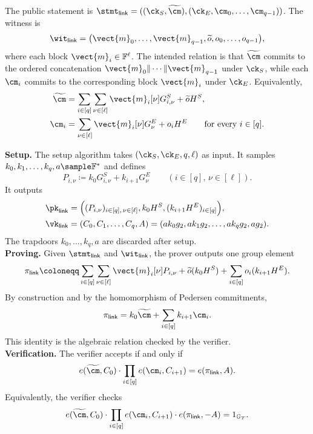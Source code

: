 The public statement is
\(\stmt_{\mathsf{link}}=((\ck_S,\widetilde{\cm}),
(\ck_E,\cm_0,\ldots,\cm_{q-1}))\).  The witness is
\[
  \wit_{\mathsf{link}}
  =
  \big(
    \vect{m}_0,\ldots,\vect{m}_{q-1},
    \widetilde{o},
    o_0,\ldots,o_{q-1}
  \big),
\]
where each block \(\vect{m}_i\in\mathbb{F}^{\ell}\).  The intended relation is
that \(\widetilde{\cm}\) commits to the ordered concatenation
\(\vect{m}_0\|\cdots\|\vect{m}_{q-1}\) under \(\ck_S\), while each
\(\cm_i\) commits to the corresponding block \(\vect{m}_i\) under \(\ck_E\).
Equivalently,
\[
\begin{aligned}
  \widetilde{\cm}
  &=
  \sum_{i\in[q]}\sum_{\nu\in[\ell]}
  \vect{m}_i[\nu]G^S_{i,\nu}
  +
  \widetilde{o}H^S, \\
  \cm_i
  &=
  \sum_{\nu\in[\ell]}
  \vect{m}_i[\nu]G^E_{\nu}
  +
  o_iH^E
  \qquad \text{for every } i\in[q].
\end{aligned}
\]

\noindent\textbf{Setup.}
The setup algorithm takes \((\ck_S,\ck_E,q,\ell)\) as input.  It samples
\(k_0,k_1,\ldots,k_q,a\sample\mathbb{F}^{\ast}\) and defines
\[
  P_{i,\nu} \coloneqq k_0G^S_{i,\nu}+k_{i+1}G^E_{\nu}
  \qquad
  (i\in[q],\,\nu\in[\ell]).
\]
It outputs
\[
\begin{aligned}
  \pk_{\mathsf{link}}
  &=
  \Big(
    (P_{i,\nu})_{i\in[q],\,\nu\in[\ell]},
    k_0H^S,
    (k_{i+1}H^E)_{i\in[q]}
  \Big), \\
  \vk_{\mathsf{link}}
  &=
  (C_0,C_1,\ldots,C_q,A)
  =
  (ak_0g_2,ak_1g_2,\ldots,ak_qg_2,ag_2).
\end{aligned}
\]
The trapdoors \(k_0,\ldots,k_q,a\) are discarded after setup. \\

\noindent\textbf{Proving.}
Given \(\stmt_{\mathsf{link}}\) and \(\wit_{\mathsf{link}}\), the prover
outputs one group element
\[
\begin{aligned}
  \pi_{\mathsf{link}}
  \coloneqq
  \sum_{i\in[q]}\sum_{\nu\in[\ell]}
  \vect{m}_i[\nu]P_{i,\nu}
  +
  \widetilde{o}(k_0H^S)
  +
  \sum_{i\in[q]} o_i(k_{i+1}H^E).
\end{aligned}
\]
By construction and by the homomorphism of Pedersen commitments,
\[
  \pi_{\mathsf{link}}
  =
  k_0\widetilde{\cm}
  +
  \sum_{i\in[q]} k_{i+1}\cm_i .
\]
This identity is the algebraic relation checked by the verifier. \\

\noindent\textbf{Verification.}
The verifier accepts if and only if
\[
  e(\widetilde{\cm},C_0)
  \cdot
  \prod_{i\in[q]} e(\cm_i,C_{i+1})
  =
  e(\pi_{\mathsf{link}},A).
\]
Equivalently, the verifier checks
\[
  e(\widetilde{\cm},C_0)
  \cdot
  \prod_{i\in[q]} e(\cm_i,C_{i+1})
  \cdot
  e(\pi_{\mathsf{link}},-A)
  =
  1_{\mathbb{G}_T}.
\]

